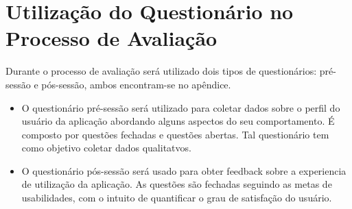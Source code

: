 \nocite{FILARDI_TRAINA_2008}

\section{Utilização do Questionário no Processo de Avaliação}

Durante o processo de avaliação será utilizado dois tipos de questionários: pré-sessão e pós-sessão, ambos encontram-se no apêndice.
\begin{itemize}
	\item O questionário pré-sessão será utilizado para coletar dados sobre o perfil do usuário da aplicação abordando alguns aspectos do seu comportamento. É composto por questões fechadas e questões abertas. Tal questionário tem como objetivo coletar dados qualitatvos.
	\item O questionário pós-sessão será usado para obter feedback sobre a experiencia de utilização da aplicação. As questões são fechadas seguindo as metas de usabilidades, com o intuito de quantificar o grau de satisfação do usuário.
\end{itemize}


